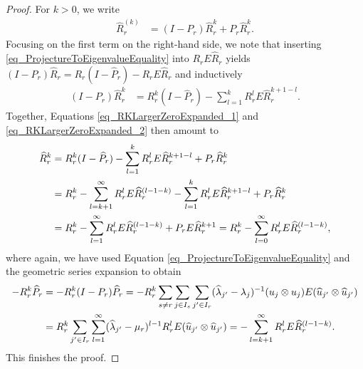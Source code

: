 \documentclass[a4paper,11pt]{article} %
\numberwithin{equation}{section}
\theoremstyle{definition}
\theoremstyle{remark}
\theoremstyle{plain}
\begin{document}
\begin{proof}
  For \( k > 0 \), we write
  \begin{align}
    \label{eq_RKLargerZeroExpanded_1}
        \widehat{R}_{r}^{ (k) } 
    & = 
        ( I - P_{r} ) \widehat{R}_{r}^{k} + P_{r} \widehat{R}_{r}^{k}.
  \end{align}
  Focusing on the first term on the right-hand side, we note that inserting \eqref{eq_ProjectureToEigenvalueEquality} into \( R_{r} E \widehat{R}_{r} \) yields \( ( I - P_{r} ) \widehat{R}_{r} = R_{r} ( I - \widehat{P}_{r} ) - R_{r} E \widehat{R}_{r} \)
  and inductively
  \begin{align}
    \label{eq_RKLargerZeroExpanded_2}
            ( I - P_{r} ) \widehat{R}_{r}^{k} 
    & = 
            R_{r}^{k} ( I - \widehat{P}_{r} ) 
          - 
            \sum_{ l = 1 }^{k} 
            R_{r}^{l} E \widehat{R}_{r}^{k + 1 - l}.
  \end{align}
  Together, Equations \eqref{eq_RKLargerZeroExpanded_1} and
                      \eqref{eq_RKLargerZeroExpanded_2} then amount to
  \begin{align}
            \widehat{R}_{r}^{k} 
    & = 
            R_{r}^{k} ( I - \widehat{P}_{r} ) 
          - 
            \sum_{ l = 1 }^{k} 
            R_{r}^{l} E \widehat{R}_{r}^{k + 1 - l}
          + 
            P_{r} \widehat{R}_{r}^{k}
    \\
    & = 
            R_{r}^{k} 
          - 
            \sum_{ l = k + 1 }^{ \infty } 
            R_{r}^{l} E \widehat{R}_{r}^{(l - 1 - k)} 
          - 
            \sum_{ l = 1 }^{k} 
            R_{r}^{l} E \widehat{R}_{r}^{k + 1 - l}
          + 
            P_{r} \widehat{R}_{r}^{k}
    \notag
    \\
    & = 
    \notag
        R_{r}^{k} 
      - 
        \sum_{ l = 1 }^{ \infty } 
        R_{r}^{l} E \widehat{R}_{r}^{ (l - 1 - k) } 
      + 
        P_{r} E \widehat{R}_{r}^{k + 1}
    = 
        R_{r}^{k} 
      - 
        \sum_{l = 0}^{ \infty } 
        R_{r}^{l} E \widehat{R}_{r}^{ (l - 1 - k) },
  \end{align}
  where again, we have used Equation \eqref{eq_ProjectureToEigenvalueEquality}
  and the geometric series expansion to obtain
  \begin{align}
        - R_{r}^{k} \widehat{P}_{r} 
    & = 
        - R_{r}^{k} ( I - P_{r} ) \widehat{P}_{r} 
    = 
        - R_{r}^{k} 
          \sum_{ s \ne r } 
          \sum_{ j  \in I_{s} }
          \sum_{ j' \in I_{r} } 
          ( \widehat{ \lambda }_{j'} - \lambda_{j} )^{-1} 
          ( u_{j} \otimes u_{j} ) E 
          ( \widehat{u}_{j'} \otimes \widehat{u}_{j'}) 
    \\
    & = 
          R_{r}^{k}
          \sum_{ j' \in I_{r} } 
          \sum_{ l = 1 }^{ \infty } 
          ( \widehat{ \lambda }_{ j' } - \mu_{r} )^{ l - 1 } R_{r}^{l}
          E ( \widehat{u}_{ j' } \otimes \widehat{u}_{ j' }) 
    = 
        - \sum_{ l = k + 1 }^{ \infty } 
          R_{r}^{l} E \widehat{R}_{r}^{ ( l - 1 - k ) }.
    \notag
  \end{align}
  This finishes the proof.
\end{proof}%
\end{document}
